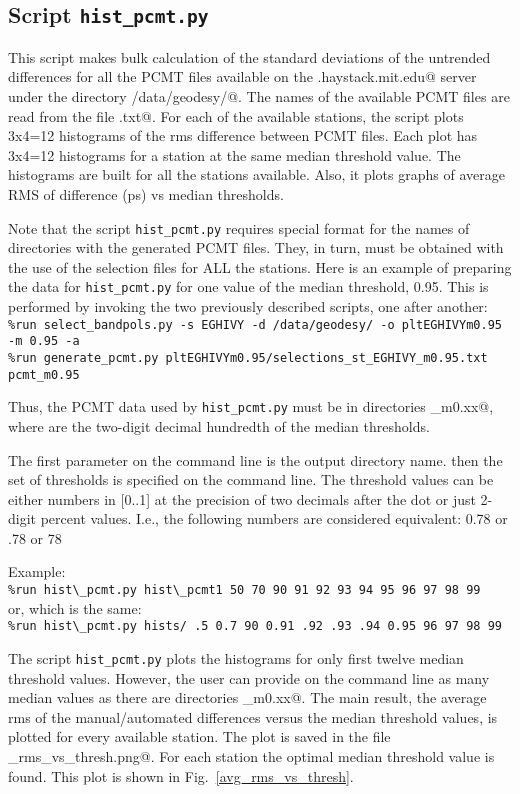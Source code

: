 \documentclass[preprint]{aastex}
\begin{document}
\subsection{Script \texttt{hist\_pcmt.py}}

This script makes bulk calculation of the standard deviations of the untrended differences for all the PCMT files available on the \verb@demi.haystack.mit.edu@ server under the directory \verb@/data/geodesy/@. The names of the available PCMT files are read from the file \verb@pcmt.txt@. For each of the available stations, the script plots 
3x4=12 histograms of the rms difference between PCMT files. Each plot has 3x4=12 histograms for a station at the same median threshold value. The histograms are built for all the stations available. Also, it plots graphs of average RMS of difference (ps) vs median thresholds. 

Note that the script \texttt{hist\_pcmt.py} requires special format for the names of directories with the generated PCMT files. They, in turn, must be obtained with the use of the selection files for ALL the stations. Here is an example of preparing the data for \texttt{hist\_pcmt.py} for one value of the median threshold, 0.95. This is performed by invoking the two previously described scripts, one after another: \\
\verb$%run select_bandpols.py -s EGHIVY -d /data/geodesy/ -o pltEGHIVYm0.95 -m 0.95 -a$ \\
\verb$%run generate_pcmt.py pltEGHIVYm0.95/selections_st_EGHIVY_m0.95.txt pcmt_m0.95$

Thus, the PCMT data used by \texttt{hist\_pcmt.py} must be in directories \verb@pcmt_m0.xx@, where \verb@xx@ are the two-digit decimal hundredth of the median thresholds. 

The first parameter on the command line is the output directory name. then the set of thresholds is specified on the command line. The threshold values can be either numbers in [0..1] at the precision of two decimals after the dot or just 2-digit percent values. I.e., the following numbers are considered equivalent: 0.78 or .78 or 78

Example: \\
\verb$%run hist\_pcmt.py hist\_pcmt1 50 70 90 91 92 93 94 95 96 97 98 99$ \\
or, which is the same: \\
\verb$%run hist\_pcmt.py hists/ .5 0.7 90 0.91 .92 .93 .94 0.95 96 97 98 99$

The script \texttt{hist\_pcmt.py} plots the histograms for only first twelve median threshold values. However, the user can provide on the command line as many median values as there are directories \verb@pcmt_m0.xx@. The main result, the average rms of the manual/automated differences versus the median threshold values, is plotted for every available station. The plot is saved in the file \verb@avg_rms_vs_thresh.png@. 
For each station the optimal median threshold value is found. This plot is shown in Fig.~\ref{avg_rms_vs_thresh}.

\begin{figure*}   [ht!]
\caption{\small Results of the search for the best median thresholds for every station.
\label{avg_rms_vs_thresh}}
\end{figure*}
\end{document}
